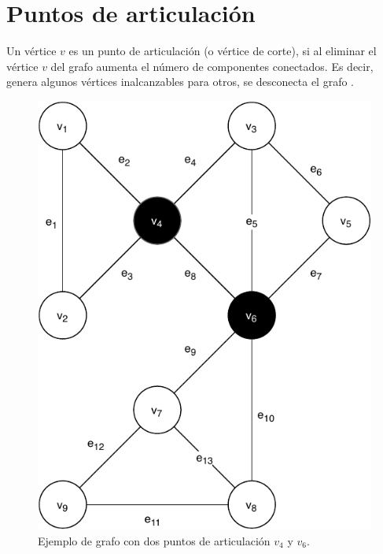 
\section{Puntos de articulación}\label{articulation-points}
Un vértice \( v \) es un punto de articulación (o vértice de corte), si al eliminar el vértice \( v \) del grafo aumenta el número de componentes conectados. Es decir, genera algunos vértices inalcanzables para otros, se desconecta el grafo \cite{Jaimini2017}.

\begin{figure}[H]
	\centering
	\includegraphics[width=0.4\linewidth]{document/ArticulationPoints/images/example-of-articulation-points}
	\caption{Ejemplo de grafo con dos puntos de articulación \( v_4 \) y \( v_6 \).}
	\label{fig:connected-disconnected-graph}
\end{figure}

